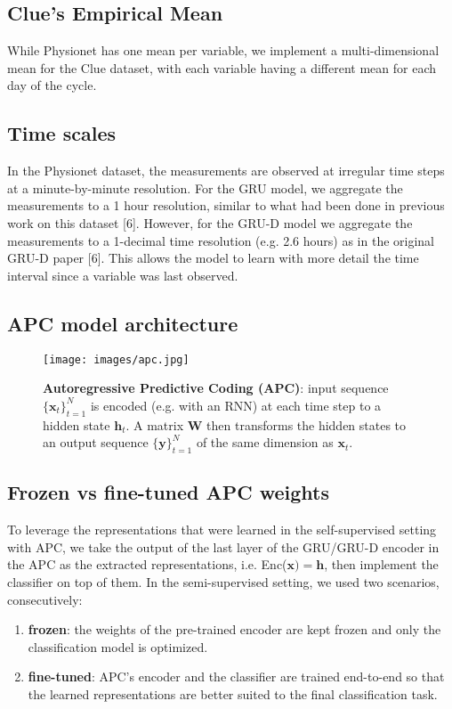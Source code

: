 \documentclass{article}
\begin{document}
\newpage
\subsection{\large Clue's Empirical Mean}
While Physionet has one mean per variable, we implement a multi-dimensional mean for the Clue dataset, with each variable having a different mean for each day of the cycle.

\subsection{\large Time scales}
In the Physionet dataset, the measurements are observed at irregular time steps
at a minute-by-minute resolution. For the GRU model, we aggregate the measurements to a 1 hour resolution, 
similar to what had been done in previous work on this dataset [6].
However, for the GRU-D model we aggregate the measurements to a 1-decimal time resolution (e.g. 2.6 hours) as in the original GRU-D paper [6].
This allows the model to learn with more detail the time interval since a variable was last observed.

\subsection{\large APC model architecture}
\begin{figure}[ht]
\vskip 0.05in
\begin{center}
\centerline{\texttt{[image: images/apc.jpg]}}
\caption{\textbf{Autoregressive Predictive Coding (APC)}: input sequence $\{\mathbf{x}_t\}_{t=1}^N$ is encoded (e.g. with an RNN) at each time step to a hidden state $\mathbf{h}_{t}$. A matrix $\mathbf{W}$ then transforms the hidden states to an output sequence $\{\mathbf{y}\}_{t=1}^N$ of the same dimension as $\mathbf{x}_t$.} 
\label{APC}
\end{center}
\vskip -0.25in
\end{figure}

\subsection{\large Frozen vs fine-tuned APC weights}
To leverage the representations that were learned in the self-supervised setting with APC, we take the output of the last layer of the GRU/GRU-D encoder in the APC as the extracted representations, i.e. Enc($\textbf{x}) = \textbf{h}$, then implement the classifier on top of them. 
In the semi-supervised setting, we used two scenarios, consecutively:
\begin{enumerate}
\setlength\itemsep{0em}
    \item \textbf{frozen}: the weights of the pre-trained encoder are kept frozen and only the classification model is optimized.
    \item \textbf{fine-tuned}: APC's encoder and the classifier are trained end-to-end so that the learned representations are better suited to the final classification task. 
\end{enumerate}
\end{document}
